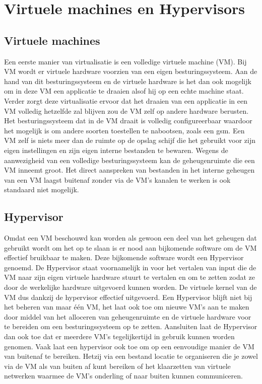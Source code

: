 \section{Virtuele machines en Hypervisors}

\subsection{Virtuele machines}
Een eerste manier van virtualisatie is een volledige virtuele machine (VM). Bij VM wordt er virtuele hardware voorzien van een eigen besturingssysteem. Aan de hand van dit besturingssysteem en de virtuele hardware is het dan ook mogelijk om in deze VM een applicatie te draaien alsof hij op een echte machine staat. Verder zorgt deze virtualisatie ervoor dat het draaien van een applicatie in een VM volledig hetzelfde zal blijven zou de VM zelf op andere hardware berusten. Het besturingssysteem dat in de VM draait is volledig configureerbaar waardoor het mogelijk is om andere soorten toestellen te nabootsen, zoals een gsm. Een VM zelf is niets meer dan de ruimte op de opslag schijf die het gebruikt voor zijn eigen instellingen en zijn eigen interne bestanden te bewaren. Wegens de aanwezigheid van een volledige besturingssysteem kan de geheugenruimte die een VM inneemt groot. Het direct aanspreken van bestanden in het interne geheugen van een VM laagst buitenaf zonder via de VM’s kanalen te werken is ook standaard niet mogelijk\autocite{Eder2016}.

\subsection{Hypervisor}

Omdat een VM beschouwd kan worden als gewoon een deel van het geheugen dat gebruikt wordt om het op te slaan is er nood aan bijkomende software om de VM effectief bruikbaar te maken. Deze bijkomende software wordt een Hypervisor genoemd. De Hypervisor staat voornamelijk in voor het vertalen van input die de VM naar zijn eigen virtuele hardware stuurt te vertalen en om te zetten zodat ze door de werkelijke hardware uitgevoerd kunnen worden. De virtuele kernel van de VM dus dankzij de hypervisor effectief uitgevoerd. Een Hypervisor blijft niet bij het beheren van maar één VM, het laat ook toe om nieuwe VM’s aan te maken door middel van het alloceren van geheugenruimte en de virtuele hardware voor te bereiden om een besturingssysteem op te zetten. Aansluiten laat de Hypervisor dan ook toe dat er meerdere VM’s tegelijkertijd in gebruik kunnen worden genomen.  Vaak laat een hypervisor ook toe om op een eenvoudige manier de VM van buitenaf te bereiken. Hetzij via een bestand locatie te organiseren die je zowel via de VM als van buiten af kunt bereiken of het klaarzetten van virtuele netwerken waarmee de VM’s onderling of naar buiten kunnen communiceren.

